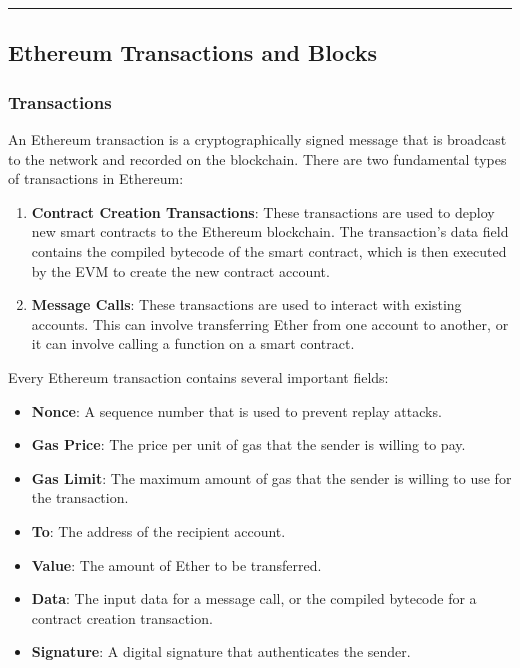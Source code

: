\begin{center}\rule{0.5\linewidth}{0.5pt}\end{center}

\subsection{Ethereum Transactions and
	Blocks}\label{section-3-ethereum-transactions-and-blocks}

\subsubsection{Transactions}\label{transactions}

An Ethereum transaction is a cryptographically signed message that is
broadcast to the network and recorded on the blockchain. There are two
fundamental types of transactions in Ethereum:

\begin{enumerate}
	\tightlist
	\item
	\textbf{Contract Creation Transactions}: These transactions are used
	to deploy new smart contracts to the Ethereum blockchain. The
	transaction's data field contains the compiled bytecode of the smart
	contract, which is then executed by the EVM to create the new contract
	account.
	\item
	\textbf{Message Calls}: These transactions are used to interact with
	existing accounts. This can involve transferring Ether from one
	account to another, or it can involve calling a function on a smart
	contract.
\end{enumerate}

Every Ethereum transaction contains several important fields:

\begin{itemize}
	\tightlist
	\item
	\textbf{Nonce}: A sequence number that is used to prevent replay
	attacks.
	\item
	\textbf{Gas Price}: The price per unit of gas that the sender is
	willing to pay.
	\item
	\textbf{Gas Limit}: The maximum amount of gas that the sender is
	willing to use for the transaction.
	\item
	\textbf{To}: The address of the recipient account.
	\item
	\textbf{Value}: The amount of Ether to be transferred.
	\item
	\textbf{Data}: The input data for a message call, or the compiled
	bytecode for a contract creation transaction.
	\item
	\textbf{Signature}: A digital signature that authenticates the sender.
\end{itemize}

